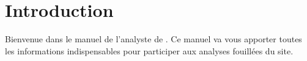 \chapter{Introduction}\hypertarget{introduction}{}\label{introduction}

Bienvenue dans le manuel de l'analyste de \boa{}. Ce manuel va vous apporter toutes les informations indispensables pour participer aux analyses fouillées du site.

